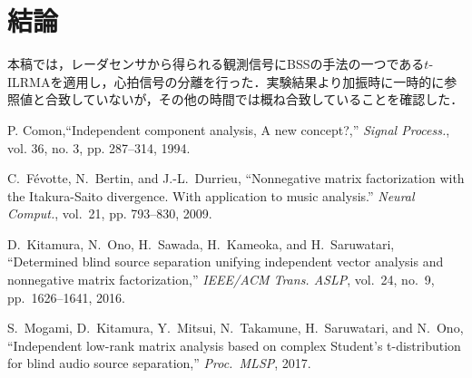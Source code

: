 \documentclass[a4j]{jsarticle}
\begin{document}
\section{結論}

本稿では，レーダセンサから得られる観測信号にBSSの手法の一つである$t$-ILRMAを適用し，心拍信号の分離を行った．実験結果より加振時に一時的に参照値と合致していないが，その他の時間では概ね合致していることを確認した．

\begin{thebibliography}{99}%
\itemsep 3pt %
\fontsize{8pt}{10pt}\selectfont  %

P. Comon,``Independent component analysis, A new concept?,'' {\em Signal Process.}, vol. 36, no. 3, pp. 287--314, 1994.

C.~Févotte, N.~Bertin, and J.-L.~Durrieu, 
``Nonnegative matrix factorization with the Itakura-Saito divergence. With application to music analysis.'' 
{\em Neural Comput.}, vol.~21, pp. 793--830, 2009.

D.~Kitamura, N.~Ono, H.~Sawada, H.~Kameoka, and H.~Saruwatari,
``Determined blind source separation unifying independent vector analysis and nonnegative matrix factorization,'' 
{\em IEEE/ACM Trans. ASLP}, vol.~24, no.~9, pp.~1626--1641, 2016.

S.~Mogami, D.~Kitamura, Y.~Mitsui, N.~Takamune, H.~Saruwatari, and N.~Ono, ``Independent low-rank matrix analysis based on complex Student's t-distribution for blind audio source     separation,''
{\em Proc.~MLSP}, 2017. 

\end{thebibliography}
\end{document}
